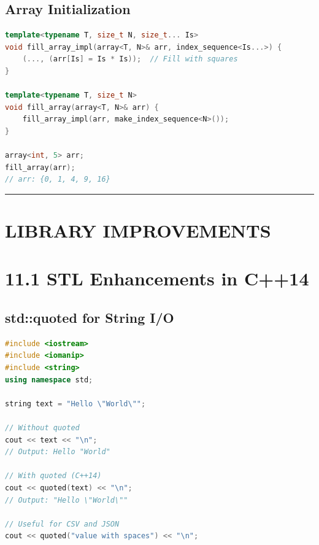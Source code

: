 \hypertarget{array-initialization}{%
\subsection{Array Initialization}\label{array-initialization}}

\begin{lstlisting}[language={C++}]
template<typename T, size_t N, size_t... Is>
void fill_array_impl(array<T, N>& arr, index_sequence<Is...>) {
    (..., (arr[Is] = Is * Is));  // Fill with squares
}

template<typename T, size_t N>
void fill_array(array<T, N>& arr) {
    fill_array_impl(arr, make_index_sequence<N>());
}

array<int, 5> arr;
fill_array(arr);
// arr: {0, 1, 4, 9, 16}
\end{lstlisting}

\begin{center}\rule{0.5\linewidth}{0.5pt}\end{center}

\hypertarget{library-improvements}{%
\section{LIBRARY IMPROVEMENTS}\label{library-improvements}}

\hypertarget{stl-enhancements-in-c14}{%
\section{11.1 STL Enhancements in C++14}\label{stl-enhancements-in-c14}}

\hypertarget{stdquoted-for-string-io}{%
\subsection{std::quoted for String I/O}\label{stdquoted-for-string-io}}

\begin{lstlisting}[language={C++}]
#include <iostream>
#include <iomanip>
#include <string>
using namespace std;

string text = "Hello \"World\"";

// Without quoted
cout << text << "\n";
// Output: Hello "World"

// With quoted (C++14)
cout << quoted(text) << "\n";
// Output: "Hello \"World\""

// Useful for CSV and JSON
cout << quoted("value with spaces") << "\n";
\end{lstlisting}

